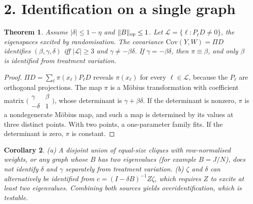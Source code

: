 \documentclass[11pt]{article}
\newtheorem{theorem}{Theorem}
\newtheorem{corollary}[theorem]{Corollary}
\theoremstyle{definition}
\begin{document}
\section*{2. Identification on a single graph}
\begin{theorem}\label{thm:id}
Assume $|\delta|\le1-\eta$ and $\|B\|_{\rm op}\le1$. Let $\mathcal L=\{\ell:P_\ell D\ne0\}$, the eigenspaces excited by
randomisation. The covariance $\mathrm{Cov}(Y,W)=\Pi D$ identifies $(\beta,\gamma,\delta)$ iff $|\mathcal L|\ge3$ and
$\gamma\ne-\beta\delta$. If $\gamma=-\beta\delta$, then $\pi\equiv\beta$, and only $\beta$ is identified from treatment variation.
\end{theorem}
\begin{proof}
$\Pi D=\sum_\ell\pi(x_\ell)P_\ell D$ reveals $\pi(x_\ell)$ for every $\ell\in\mathcal L$, because the $P_\ell$ are orthogonal
projections. The map $\pi$ is a M\"obius transformation with coefficient matrix
$\bigl(\begin{smallmatrix}\gamma&\beta\\-\delta&1\end{smallmatrix}\bigr)$, whose determinant is $\gamma+\beta\delta$. If the
determinant is nonzero, $\pi$ is a nondegenerate M\"obius map, and such a map is determined by its
values at three distinct points. With two points, a one-parameter family fits. If the determinant is zero, $\pi$ is constant.
\end{proof}
\begin{corollary}
(a) A disjoint union of equal-size cliques with row-normalised weights, or any graph whose $B$ has two eigenvalues (for
example $B=J/N$), does not identify $\delta$ and $\gamma$ separately from treatment variation.
(b) $\zeta$ and $\delta$ can alternatively be identified from $c=(I-\delta B)^{-1}Z\zeta$, which requires $Z$ to excite at
least two eigenvalues. Combining both sources yields overidentification, which is testable.
\end{corollary}
\end{document}
